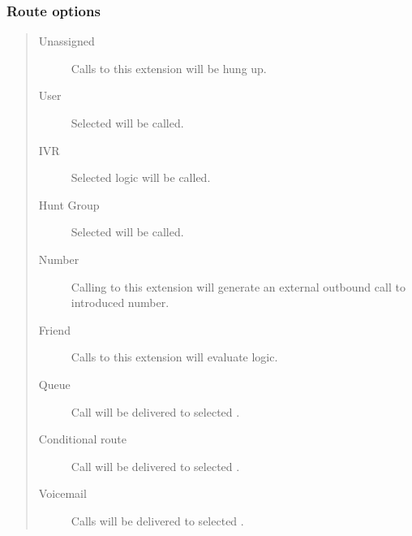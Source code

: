 \documentclass[letterpaper,10pt,spanish]{sphinxmanual}
\begin{document}
\subsubsection{Route options}
\label{administration_portal/client/vpbx/extensions:route-options}\begin{quote}
\begin{description}
\item[{Unassigned}] \leavevmode
Calls to this extension will be hung up.

\item[{User}] \leavevmode
Selected {\hyperref[administration_portal/client/vpbx/users:users]{}} will be called.

\item[{IVR}] \leavevmode
Selected {\hyperref[administration_portal/client/vpbx/routing_endpoints/ivrs:ivrs]{}} logic will be called.

\item[{Hunt Group}] \leavevmode
Selected {\hyperref[administration_portal/client/vpbx/routing_endpoints/hunt_groups:huntgroups]{}} will be called.

\item[{Number}] \leavevmode
Calling to this extension will generate an external outbound call
to introduced number.

\item[{Friend}] \leavevmode
Calls to this extension will evaluate {\hyperref[administration_portal/client/vpbx/routing_endpoints/friends/index:friends]{}} logic.

\item[{Queue}] \leavevmode
Call will be delivered to selected {\hyperref[administration_portal/client/vpbx/routing_endpoints/queues:queues]{}}.

\item[{Conditional route}] \leavevmode
Call will be delivered to selected {\hyperref[administration_portal/client/vpbx/routing_endpoints/conditional_routes:id1]{}}.

\item[{Voicemail}] \leavevmode
Calls will be delivered to selected {\hyperref[administration_portal/client/vpbx/voicemails:voicemails]{}}.

\end{description}
\end{quote}
\end{document}

